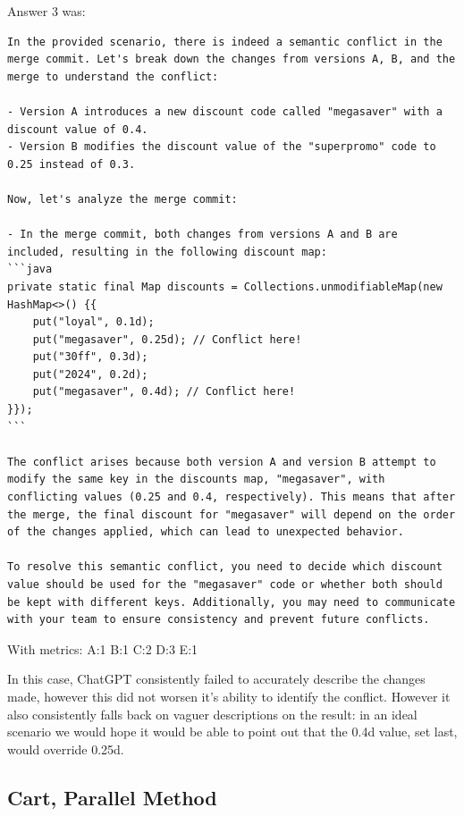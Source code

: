 Answer 3 was:
\begin{lstlisting}
In the provided scenario, there is indeed a semantic conflict in the merge commit. Let's break down the changes from versions A, B, and the merge to understand the conflict:

- Version A introduces a new discount code called "megasaver" with a discount value of 0.4.
- Version B modifies the discount value of the "superpromo" code to 0.25 instead of 0.3.

Now, let's analyze the merge commit:

- In the merge commit, both changes from versions A and B are included, resulting in the following discount map:
```java
private static final Map discounts = Collections.unmodifiableMap(new HashMap<>() {{
    put("loyal", 0.1d);
    put("megasaver", 0.25d); // Conflict here!
    put("30ff", 0.3d);
    put("2024", 0.2d);
    put("megasaver", 0.4d); // Conflict here!
}});
```

The conflict arises because both version A and version B attempt to modify the same key in the discounts map, "megasaver", with conflicting values (0.25 and 0.4, respectively). This means that after the merge, the final discount for "megasaver" will depend on the order of the changes applied, which can lead to unexpected behavior.

To resolve this semantic conflict, you need to decide which discount value should be used for the "megasaver" code or whether both should be kept with different keys. Additionally, you may need to communicate with your team to ensure consistency and prevent future conflicts.
\end{lstlisting}

With metrics:
A:1
B:1
C:2
D:3
E:1

In this case, ChatGPT consistently failed to accurately describe the changes made, however this did not worsen it's ability to identify the conflict. However it also consistently falls back on vaguer descriptions on the result: in an ideal scenario we would hope it would be able to point out that the 0.4d value, set last, would override 0.25d.

\subsection{Cart, Parallel Method}

